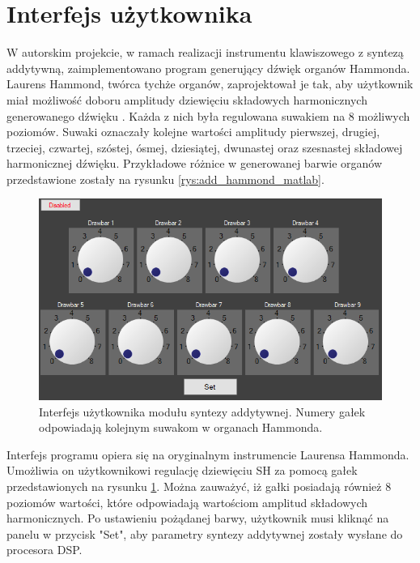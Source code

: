 \section{Interfejs użytkownika}
W autorskim projekcie, w ramach realizacji instrumentu klawiszowego z syntezą addytywną, zaimplementowano program generujący dźwięk organów Hammonda. 
Laurens Hammond, twórca tychże organów, zaprojektował je tak, aby użytkownik miał możliwość doboru amplitudy dziewięciu składowych harmonicznych generowanego dźwięku \cite{add_hammond_soundonsound}. Każda z nich była regulowana suwakiem na 8 możliwych poziomów. Suwaki oznaczały kolejne wartości amplitudy pierwszej, drugiej, trzeciej, czwartej, szóstej, ósmej, dziesiątej, dwunastej oraz szesnastej składowej harmonicznej dźwięku. Przykładowe różnice w generowanej barwie organów przedstawione zostały na rysunku \ref{rys:add_hammond_matlab}.

\begin{figure}[H]
	\centering
	\includegraphics[width=15cm]{grafiki/add_interface}
	\captionsetup{justification=centering}
	\caption{Interfejs użytkownika modułu syntezy addytywnej. Numery gałek odpowiadają kolejnym suwakom w organach Hammonda.}
	\label{rys:add_interface}
\end{figure}

Interfejs programu opiera się na oryginalnym instrumencie Laurensa Hammonda. Umożliwia on użytkownikowi regulację dziewięciu SH za pomocą gałek przedstawionych na rysunku \ref{rys:add_interface}. Można zauważyć, iż gałki posiadają również 8 poziomów wartości, które odpowiadają wartościom amplitud składowych harmonicznych. Po ustawieniu pożądanej barwy, użytkownik musi kliknąć na panelu w przycisk "Set", aby parametry syntezy addytywnej zostały wysłane do procesora DSP.

